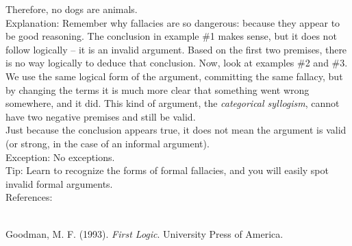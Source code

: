 \documentclass[a4paper,12pt,single,pdftex]{scrartcl}
\begin{document}
    
      Therefore, no dogs are animals.
    \\

    
      Explanation: Remember why fallacies are so dangerous: because they appear to be good reasoning.  The conclusion in example \#1 makes sense, but it does not follow logically -- it is an invalid argument.  Based on the first two premises, there is no way logically to deduce that conclusion.  Now, look at examples \#2 and \#3.  We use the same logical form of the argument, committing the same fallacy, but by changing the terms it is much more clear that something went wrong somewhere, and it did.  This kind of argument, the {\it categorical syllogism}, cannot have two negative premises and still be valid.
    \\

    
      Just because the conclusion appears true, it does not mean the argument is valid (or strong, in the case of an informal argument).
    \\

    
      Exception: No exceptions.
    \\

    
      Tip: Learn to recognize the forms of formal fallacies, and you will easily spot invalid formal arguments.
    \\

    References:

    
      
        
      \\

      
        
          Goodman, M. F. (1993). {\it First Logic}. University Press of America.
        
      
    
  
\end{document}
